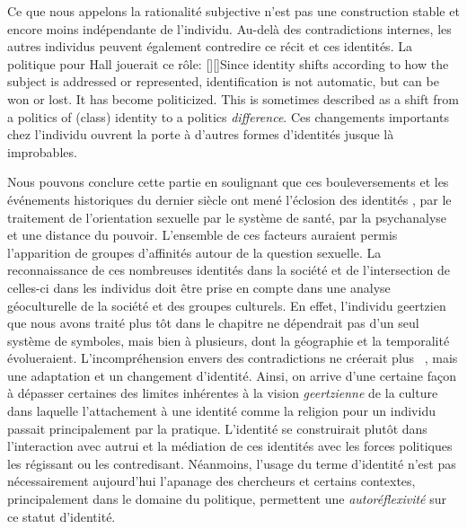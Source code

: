 Ce que nous appelons la rationalité subjective n'est pas une construction stable et encore moins indépendante de l'individu.
Au-delà des contradictions internes, les autres individus peuvent également contredire ce récit et ces identités.
La politique pour Hall jouerait ce rôle: [{\citeyear[610]{Hall1996a}}][]{Since identity shifts according to how the subject is addressed or represented, identification is not automatic, but can be won or lost. It has become politicized. This is sometimes described as a shift from a politics of (class) identity to a politics \emph{difference}}.
Ces changements importants chez l'individu ouvrent la porte à d'autres formes d'identités jusque là improbables.

Nous pouvons conclure cette partie en soulignant que ces bouleversements et les événements historiques du dernier siècle ont mené l'éclosion des identités \lgbt{}, par le traitement de l'orientation sexuelle par le système de santé, par la psychanalyse et une distance du pouvoir.
L'ensemble de ces facteurs auraient permis l'apparition de groupes d'affinités autour de la question sexuelle.
La reconnaissance de ces nombreuses identités dans la société et de l'intersection de celles-ci dans les individus doit être prise en compte dans une analyse géoculturelle de la société et des groupes culturels.
En effet, l'individu geertzien que nous avons traité plus tôt dans le chapitre ne  dépendrait pas d'un seul système de symboles, mais bien à plusieurs, dont la géographie et la temporalité évolueraient.
L'incompréhension envers des contradictions ne créerait plus ~\citep[33]{Geertz1972}, mais une adaptation et un changement d'identité.
Ainsi, on arrive d'une certaine façon à dépasser certaines des limites inhérentes à la vision \emph{geertzienne} de la culture dans laquelle l'attachement à une identité comme la religion pour un individu passait principalement par la pratique.
L'identité se construirait plutôt dans l'interaction avec autrui et la médiation de ces identités avec les forces politiques les régissant ou les contredisant.
Néanmoins, l'usage du terme d'identité n'est pas nécessairement aujourd'hui l'apanage des chercheurs et certains contextes, principalement dans le domaine du politique, permettent une \emph{autoréflexivité} sur ce statut d'identité.

